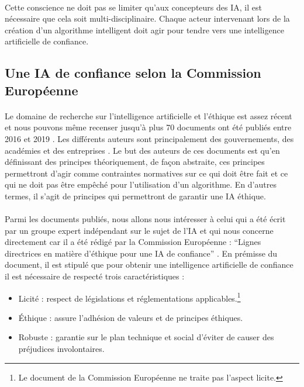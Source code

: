\documentclass[10pt, french, a4paper]{report}
\begin{document}
\paragraph{}
Cette conscience ne doit pas se limiter qu’aux concepteurs des IA, il est nécessaire que cela soit multi-disciplinaire. Chaque acteur intervenant lors de la création d'un algorithme intelligent doit agir pour tendre vers une intelligence artificielle de confiance.

\subsection{Une IA de confiance selon la Commission Européenne}
\label{subsec:ia_confiance_com_ue}

\paragraph{}
Le domaine de recherche sur l'intelligence artificielle et l'éthique est assez récent et nous pouvons même recenser jusqu'à plus 70 documents ont été publiés entre 2016 et 2019 \citep{algorithm_watch_ai_2020}. Les différents auteurs sont principalement des gouvernements, des académies et des entreprises \citep{morley_what_2019}. Le but des auteurs de ces documents est qu'en définissant des principes théoriquement, de façon abstraite, ces principes permettront d'agir comme contraintes normatives \citep{turilli_ethical_2007} sur ce qui doit être fait et ce qui ne doit pas être empêché pour l'utilisation d'un algorithme. En d'autres termes, il s'agit de principes qui permettront de garantir une IA éthique.

\paragraph{}
Parmi les documents publiés, nous allons nous intéresser à celui qui a été écrit par un groupe expert indépendant sur le sujet de l'IA et qui nous concerne directement car il a été rédigé par la Commission Européenne : ``Lignes directrices en matière d'éthique pour une IA de confiance'' \citep{commission_europeenne_ethics_2019}. En prémisse du document, il est stipulé que pour obtenir une intelligence artificielle de confiance il est nécessaire de respecté trois caractéristiques : 

\begin{itemize}
  \item Licité : respect de législations et réglementations applicables.\footnote{Le document de la Commission Européenne ne traite pas l'aspect licite.}
  \item \uppercase{é}thique : assure l'adhésion de valeurs et de principes éthiques.
  \item Robuste : garantie sur le plan technique et social d'éviter de causer des préjudices involontaires.
\end{itemize}
\end{document}
